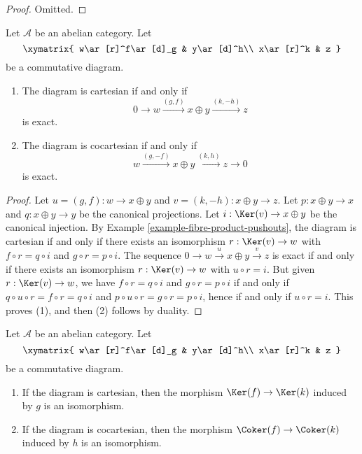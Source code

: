 \begin{proof}
Omitted.
\end{proof}

\begin{lemma}
\label{lemma-characterize-cartesian}
Let $\mathcal{A}$ be an abelian category. Let
$$
\xymatrix{
w\ar[r]^f\ar[d]_g
& y\ar[d]^h\\
x\ar[r]^k
& z
}
$$
be a commutative diagram. 
\begin{enumerate}
\item The diagram is cartesian if and only if 
$$
0 \to w \xrightarrow{(g, f)} x \oplus y \xrightarrow{(k, -h)} z
$$ 
is exact.
\item The diagram is cocartesian if and only if 
$$
w \xrightarrow{(g, -f)} x \oplus y \xrightarrow{(k, h)} z \to 0
$$ 
is exact.
\end{enumerate}
\end{lemma}

\begin{proof}
Let $u = (g, f) : w \to x \oplus y$ and $v = (k, -h) : x \oplus y \to z$. 
Let $p : x \oplus y \to x$ and $q : x \oplus y \to y$ be the canonical 
projections. Let $i : \Ker(v) \to x \oplus y$ be the canonical 
injection. By Example \ref{example-fibre-product-pushouts}, the diagram is 
cartesian if and only if there exists an isomorphism 
$r : \Ker(v) \to w$ with $f \circ r = q \circ i$ and 
$g \circ r = p \circ i$. The sequence 
$0 \to w \overset{u} \to x \oplus y \overset{v} \to z$ is exact if and 
only if there exists an isomorphism $r : \Ker(v) \to w$ with 
$u \circ r = i$. But given $r : \Ker(v) \to w$, we have 
$f \circ r = q \circ i$ and $g \circ r = p \circ i$ if and 
only if $q \circ u \circ r= f \circ r = q \circ i$ and 
$p \circ u \circ r = g \circ r = p \circ i$, hence if and only if
$u \circ r = i$. This proves (1), and then (2) follows by duality. 
\end{proof}

\begin{lemma}
\label{lemma-cartesian-kernel}
Let $\mathcal{A}$ be an abelian category. Let
$$
\xymatrix{
w\ar[r]^f\ar[d]_g
& y\ar[d]^h\\
x\ar[r]^k
& z
}
$$
be a commutative diagram.
\begin{enumerate}
\item If the diagram is cartesian, then the morphism 
$\Ker(f)\to\Ker(k)$ induced by $g$ is an isomorphism.
\item If the diagram is cocartesian, then the morphism 
$\Coker(f)\to\Coker(k)$ induced by $h$ is an isomorphism.
\end{enumerate}
\end{lemma}

